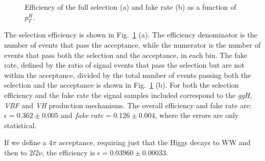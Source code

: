 \begin{figure}[t]
\centering
{}
\caption{Efficiency of the full selection (a) and fake rate (b) as a function of $p_T^H$.\label{fig:sel_eff}}
\end{figure}

The selection efficiency is shown in Fig.~\ref{fig:sel_eff} (a). The efficiency denominator is the number of events that pass the acceptance, while the numerator is the number of events that pass both the selection and the acceptance, in each \pth bin. The fake rate, defined by the ratio of signal events that pass the selection but are not within the acceptance, divided by the total number of events passing both the selection and the acceptance is shown in Fig.~\ref{fig:sel_eff} (b). For both the selection efficiency and the fake rate the signal samples included correspond to the \textit{ggH}, \textit{VBF} and \textit{VH} production mechanisms.
The overall efficiency and fake rate are: $\epsilon=0.362\pm{0.005}$ and $fake~rate=0.126\pm0.004$, where the errors are only statistical.

If we define a $4\pi$ acceptance, requiring just that the Higgs decays to WW and then to $2l2\nu$, the efficiency is $\epsilon=0.03960\pm{0.00033}$. 

